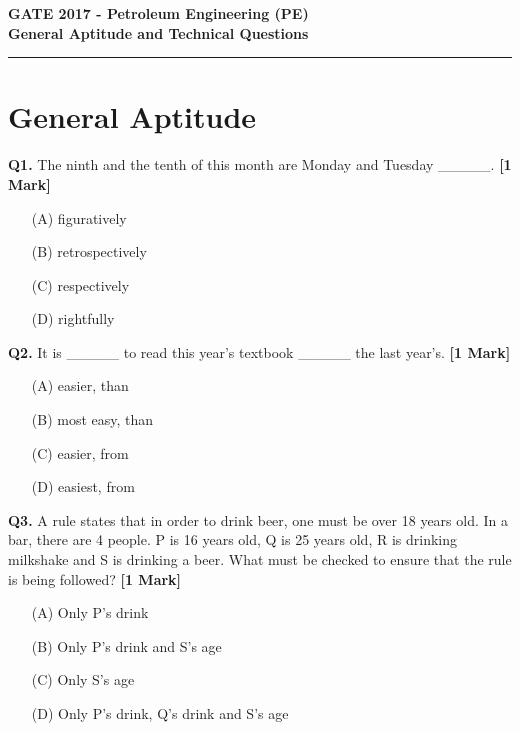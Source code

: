 \documentclass[11pt]{article}
\newcommand{\questiona}[2]{
    \noindent\textbf{Q#2.} #1 \hfill \textbf{[1 Mark]}
}
\begin{document}
\begin{center}
    \Large\textbf{GATE 2017 - Petroleum Engineering (PE)} \\
    \large\textbf{General Aptitude and Technical Questions} \\
    \rule{\textwidth}{0.5pt} %
\end{center}

\vspace{0.5cm}

\section*{General Aptitude}

\questiona{The ninth and the tenth of this month are Monday and Tuesday \_\_\_\_\_.}{1}
\begin{enumerate}
    \item[(A)] figuratively  
    \item[(B)] retrospectively  
    \item[(C)] respectively  
    \item[(D)] rightfully  
\end{enumerate}
\vspace{0.5cm}

\questiona{It is \_\_\_\_\_ to read this year's textbook \_\_\_\_\_ the last year's.}{2}
\begin{enumerate}
    \item[(A)] easier, than  
    \item[(B)] most easy, than  
    \item[(C)] easier, from  
    \item[(D)] easiest, from  
\end{enumerate}
\vspace{0.5cm}

\questiona{A rule states that in order to drink beer, one must be over 18 years old. In a bar, there are 4 people. P is 16 years old, Q is 25 years old, R is drinking milkshake and S is drinking a beer. What must be checked to ensure that the rule is being followed?}{3}
\begin{enumerate}
    \item[(A)] Only P's drink  
    \item[(B)] Only P's drink and S's age  
    \item[(C)] Only S's age  
    \item[(D)] Only P's drink, Q's drink and S's age  
\end{enumerate}
\vspace{0.5cm}
\end{document}
